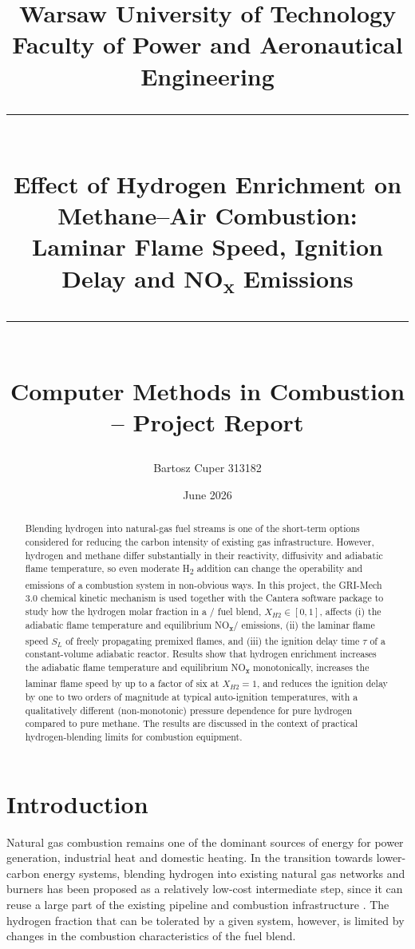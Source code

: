 \documentclass[11pt,a4paper]{article}
\title{
    \large Warsaw University of Technology \\
    Faculty of Power and Aeronautical Engineering \\[1cm]
    \rule{\linewidth}{0.5pt}\\[0.4cm]
    \LARGE \textbf{Effect of Hydrogen Enrichment on Methane--Air Combustion:\\
    Laminar Flame Speed, Ignition Delay and NO\textsubscript{x} Emissions}\\[0.2cm]
    \rule{\linewidth}{0.5pt}\\[0.5cm]
    \large Computer Methods in Combustion -- Project Report
}
\author{Bartosz Cuper 313182}
\date{June 2026}
\begin{document}
\maketitle
\thispagestyle{empty}
\newpage

\begin{abstract}
Blending hydrogen into natural-gas fuel streams is one of the short-term options considered for reducing the carbon
intensity of existing gas infrastructure. However, hydrogen and methane differ substantially in their reactivity,
diffusivity and adiabatic flame temperature, so even moderate H\textsubscript{2} addition can change the
operability and emissions of a combustion system in non-obvious ways. In this project, the GRI-Mech 3.0 chemical
kinetic mechanism is used together with the Cantera software package to study how the hydrogen molar fraction in a
/ fuel blend, $X_{H2} \in [0,1]$, affects (i) the adiabatic flame temperature and equilibrium
NO\textsubscript{x}/ emissions, (ii) the laminar flame speed $S_L$ of freely propagating premixed flames, and (iii) the
ignition delay time $\tau$ of a constant-volume adiabatic reactor. Results show that hydrogen enrichment increases
the adiabatic flame temperature and equilibrium NO\textsubscript{x} monotonically, increases the laminar flame speed by up to
a factor of six at $X_{H2}=1$, and reduces the ignition delay by one to two orders of magnitude at typical
auto-ignition temperatures, with a qualitatively different (non-monotonic) pressure dependence for pure hydrogen
compared to pure methane. The results are discussed in the context of practical hydrogen-blending limits for
combustion equipment.
\end{abstract}
\newpage

\tableofcontents

\newpage

\section{Introduction}

Natural gas combustion remains one of the dominant sources of energy for power generation, industrial heat and
domestic heating. In the transition towards lower-carbon energy systems, blending hydrogen into existing natural
gas networks and burners has been proposed as a relatively low-cost intermediate step, since it can reuse a large
part of the existing pipeline and combustion infrastructure \cite{donohoe2014}. The hydrogen fraction that can be
tolerated by a given system, however, is limited by changes in the combustion characteristics of the fuel blend.
\end{document}
